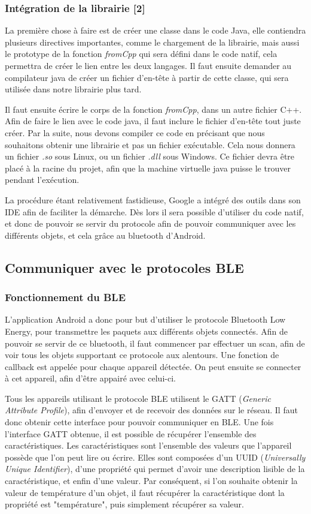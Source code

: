 \subsubsection{Intégration de la librairie [2]}
La première chose à faire est de créer une classe dans le code Java, elle contiendra plusieurs directives 
importantes, comme le chargement de la librairie, mais aussi le prototype de la fonction \emph{fromCpp} qui 
sera défini dans le code natif, cela permettra de créer le lien entre les deux langages. Il faut ensuite 
demander au compilateur java de créer un fichier d'en-tête à partir de cette classe, qui sera utilisée dans 
notre librairie plus tard.

Il faut ensuite écrire le corps de la fonction \emph{fromCpp}, dans un autre fichier C++. Afin de faire le 
lien avec le code java, il faut inclure le fichier d'en-tête tout juste créer. Par la suite, nous devons 
compiler ce code en précisant que nous souhaitons obtenir une librairie et pas un fichier exécutable. Cela 
nous donnera un fichier \emph{.so} sous Linux, ou un fichier \emph{.dll} sous Windows. Ce fichier devra 
être placé à la racine du projet, afin que la machine virtuelle java puisse le trouver pendant l'exécution.

La procédure étant relativement fastidieuse, Google a intégré des outils dans son IDE afin de faciliter la 
démarche. Dès lors il sera possible d'utiliser du code natif, et donc de pouvoir se servir du protocole afin 
de pouvoir communiquer avec les différents objets, et cela grâce au bluetooth d'Android.


	\subsection{Communiquer avec le protocoles BLE}
	  \subsubsection{Fonctionnement du BLE}
L'application Android a donc pour but d'utiliser le protocole Bluetooth Low Energy, pour transmettre les 
paquets aux différents objets connectés. Afin de pouvoir se servir de ce bluetooth, il faut commencer par 
effectuer un scan, afin de voir tous les objets supportant ce protocole aux alentours. Une fonction de 
callback est appelée pour chaque appareil détectée. On peut ensuite se connecter à cet appareil, afin d'être 
appairé avec celui-ci.

Tous les appareils utilisant le protocole BLE utilisent le GATT (\emph{Generic Attribute Profile}), afin 
d'envoyer et de recevoir des données sur le réseau. Il faut donc obtenir cette interface pour pouvoir 
communiquer en BLE. Une fois l'interface GATT obtenue, il est possible de récupérer l'ensemble des 
caractéristiques. Les caractéristiques sont l'ensemble des valeurs que l'appareil possède que l'on peut lire 
ou écrire. Elles sont composées d'un UUID (\emph{Universally Unique Identifier}), d'une propriété qui permet 
d'avoir une description lisible de la caractéristique, et enfin d'une valeur. Par conséquent, si l'on souhaite 
obtenir la valeur de température d'un objet, il faut récupérer la caractéristique dont la propriété est 
"température", puis simplement récupérer sa valeur.

